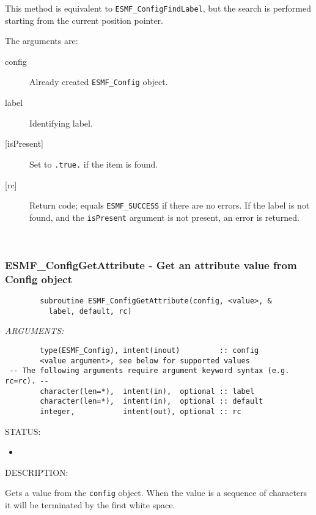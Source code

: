      This method is equivalent to {\tt ESMF\_ConfigFindLabel}, but the search
     is performed starting from the current position pointer.
  
     The arguments are:
     \begin{description}
     \item [config]
       Already created {\tt ESMF\_Config} object.
     \item [label]
       Identifying label.
     \item [{[isPresent]}]
       Set to {\tt .true.} if the item is found.
     \item [{[rc]}]
       Return code; equals {\tt ESMF\_SUCCESS} if there are no errors.
       If the label is not found, and the {\tt isPresent} argument is
       not present, an error is returned.
     \end{description}
   
 
\mbox{}\hrulefill\ 
 
\subsubsection [ESMF\_ConfigGetAttribute] {ESMF\_ConfigGetAttribute - Get an attribute value from Config object}


  
  
\begin{verbatim}        subroutine ESMF_ConfigGetAttribute(config, <value>, &
          label, default, rc)\end{verbatim}{\em ARGUMENTS:}
\begin{verbatim}        type(ESMF_Config), intent(inout)         :: config     
        <value argument>, see below for supported values
 -- The following arguments require argument keyword syntax (e.g. rc=rc). --
        character(len=*),  intent(in),  optional :: label 
        character(len=*),  intent(in),  optional :: default 
        integer,           intent(out), optional :: rc     \end{verbatim}
{\sf STATUS:}
   \begin{itemize}
   \item{}
   \end{itemize}
  
{\sf DESCRIPTION:\\ }

 
        Gets a value from the {\tt config} object.  When the
        value is a sequence of characters
        it will be terminated by the first white space.
        
